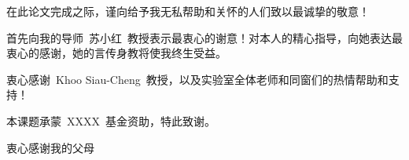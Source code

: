

在此论文完成之际，谨向给予我无私帮助和关怀的人们致以最诚挚的敬意！

首先向我的导师~苏小红~教授表示最衷心的谢意！对本人的精心指导，向她表达最衷心的感谢，她的言传身教将使我终生受益。

衷心感谢~Khoo Siau-Cheng~教授，以及实验室全体老师和同窗们的热情帮助和支持！


本课题承蒙~XXXX~基金资助，特此致谢。

衷心感谢我的父母
